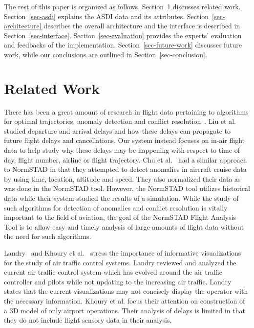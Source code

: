 \documentclass{sig-alternate}
\begin{document}
The rest of this paper is organized as follows. Section~\ref{sec-related-work}
discusses related
work. Section~\ref{sec-asdi} explains the ASDI data and its attributes. 
Section~\ref{sec-architecture} describes
the overall architecture and the interface is described in Section~\ref{sec-interface}.
Section~\ref{sec-evaluation}
provides the experts' evaluation
and feedbacks of the implementation. Section~\ref{sec-future-work}
discusses future work, while our conclusions
are outlined in Section~\ref{sec-conclusion}.

\section{Related Work}
\label{sec-related-work}

There has been a great amount of research in flight data pertaining to algorithms
for optimal trajectories, anomaly detection and conflict 
resolution~\cite{Basu09, Cao06, Chu10, Liu08, Rama06, Wang04}.
Liu et al.~\cite{Liu08} studied departure and arrival delays and how these delays
can propagate to future flight delays and cancellations. Our system instead focuses
on in-air flight data to help study why these delays may be happening with 
respect to time of day, flight number, airline or flight trajectory. 
Chu et al.~\cite{Chu10} had a similar approach to NormSTAD in that they
attempted to detect anomalies in aircraft cruise data by using time, location, altitude 
and speed. They also normalized their data as was done in the NormSTAD tool. However,
the NormSTAD tool utilizes historical data while their system studied the results
of a simulation. While the study of such algorithms for detection of anomalies and conflict
resolution is vitally important to the field of aviation, the goal of the NormSTAD Flight Analysis 
Tool is to allow easy and timely analysis of large amounts of flight data without the need
for such algorithms.

Landry~\cite{Landry11} and Khoury et al.~\cite{Khoury06} stress the importance
of informative visualizations for the study of air traffic control systems.
Landry reviewed and analyzed the current air traffic control system which 
has evolved around the air traffic controller and pilots while not 
updating to the increasing air traffic. Landry states that the 
current visualizations may not concisely display the operator with the 
necessary information. Khoury et al. focus their attention on 
construction of a 3D model of only airport operations. Their analysis of delays
is limited in that they do not include flight sensory data in their analysis.
\end{document}

